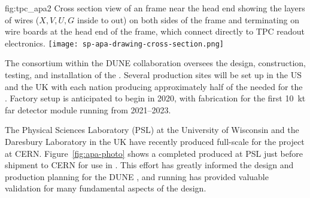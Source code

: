 \begin{dunefigure}{fig:tpc_apa2}
{Cross section view of an  frame near the head end showing the layers of wires ($X,V,U,G$ inside to out) on both sides of the frame and terminating on wire boards at the head end of the frame, which connect directly to TPC readout electronics.} 
\texttt{[image: sp-apa-drawing-cross-section.png]} 
\end{dunefigure} 


The  consortium within the DUNE collaboration oversees the design, construction, testing, and installation of the . Several  production sites will be set up in the US and the UK with each nation producing approximately half of the  needed for the %
.  Factory setup is anticipated to begin in 2020, with  fabrication for the first \SI{10}{kt} far detector module running from 2021--2023.  

The Physical Sciences Laboratory (PSL) at the University of Wisconsin and the Daresbury Laboratory in the UK have recently produced full-scale  for the  project at CERN. Figure~\ref{fig:apa-photo} shows a completed  produced at PSL just before shipment to CERN for use in . This effort has greatly informed the design and production planning for the DUNE , and  running has provided valuable validation for many fundamental aspects of the   design. 


